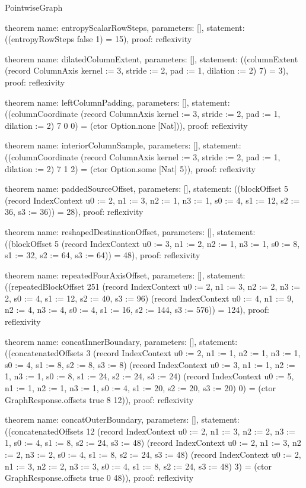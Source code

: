 \begin{lexlean}{PointwiseGraph}
\begin{semanticmodule}
theorem{
  name: entropyScalarRowSteps,
  parameters: [],
  statement: ((entropyRowSteps false 1) = 15),
  proof: reflexivity{}
}

theorem{
  name: dilatedColumnExtent,
  parameters: [],
  statement: ((columnExtent (record ColumnAxis {kernel := 3, stride := 2, pad := 1, dilation := 2}) 7) = 3),
  proof: reflexivity{}
}

theorem{
  name: leftColumnPadding,
  parameters: [],
  statement: ((columnCoordinate (record ColumnAxis {kernel := 3, stride := 2, pad := 1, dilation := 2}) 7 0 0) = (ctor Option.none [Nat])),
  proof: reflexivity{}
}

theorem{
  name: interiorColumnSample,
  parameters: [],
  statement: ((columnCoordinate (record ColumnAxis {kernel := 3, stride := 2, pad := 1, dilation := 2}) 7 1 2) = (ctor Option.some [Nat] 5)),
  proof: reflexivity{}
}

theorem{
  name: paddedSourceOffset,
  parameters: [],
  statement: ((blockOffset 5 (record IndexContext {u0 := 2, n1 := 3, n2 := 1, n3 := 1, s0 := 4, s1 := 12, s2 := 36, s3 := 36})) = 28),
  proof: reflexivity{}
}

theorem{
  name: reshapedDestinationOffset,
  parameters: [],
  statement: ((blockOffset 5 (record IndexContext {u0 := 3, n1 := 2, n2 := 1, n3 := 1, s0 := 8, s1 := 32, s2 := 64, s3 := 64})) = 48),
  proof: reflexivity{}
}

theorem{
  name: repeatedFourAxisOffset,
  parameters: [],
  statement: ((repeatedBlockOffset 251 (record IndexContext {u0 := 2, n1 := 3, n2 := 2, n3 := 2, s0 := 4, s1 := 12, s2 := 40, s3 := 96}) (record IndexContext {u0 := 4, n1 := 9, n2 := 4, n3 := 4, s0 := 4, s1 := 16, s2 := 144, s3 := 576})) = 124),
  proof: reflexivity{}
}

theorem{
  name: concatInnerBoundary,
  parameters: [],
  statement: ((concatenatedOffsets 3 (record IndexContext {u0 := 2, n1 := 1, n2 := 1, n3 := 1, s0 := 4, s1 := 8, s2 := 8, s3 := 8}) (record IndexContext {u0 := 3, n1 := 1, n2 := 1, n3 := 1, s0 := 8, s1 := 24, s2 := 24, s3 := 24}) (record IndexContext {u0 := 5, n1 := 1, n2 := 1, n3 := 1, s0 := 4, s1 := 20, s2 := 20, s3 := 20}) 0) = (ctor GraphResponse.offsets true 8 12)),
  proof: reflexivity{}
}

theorem{
  name: concatOuterBoundary,
  parameters: [],
  statement: ((concatenatedOffsets 12 (record IndexContext {u0 := 2, n1 := 3, n2 := 2, n3 := 1, s0 := 4, s1 := 8, s2 := 24, s3 := 48}) (record IndexContext {u0 := 2, n1 := 3, n2 := 2, n3 := 2, s0 := 4, s1 := 8, s2 := 24, s3 := 48}) (record IndexContext {u0 := 2, n1 := 3, n2 := 2, n3 := 3, s0 := 4, s1 := 8, s2 := 24, s3 := 48}) 3) = (ctor GraphResponse.offsets true 0 48)),
  proof: reflexivity{}
}


\end{semanticmodule}
\end{lexlean}
